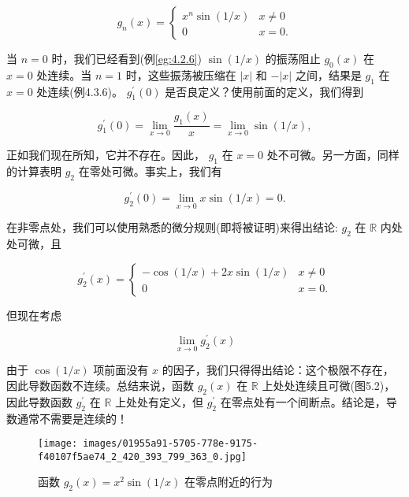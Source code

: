 \[
{g}_{n}\left( x\right)  = \left\{  \begin{array}{ll} {x}^{n}\sin \left( {1/x}\right) & x \neq  0 \\  0 & x = 0. \end{array}\right.
\]

当 \(n = 0\) 时，我们已经看到(例\ref{eg:4.2.6}) \(\sin \left( {1/x}\right)\) 的振荡阻止 \({g}_{0}\left( x\right)\) 在 \(x = 0\) 处连续。当 \(n = 1\) 时，这些振荡被压缩在 \(\left| x\right|\) 和 \(- \left| x\right|\) 之间，结果是 \({g}_{1}\) 在 \(x = 0\) 处连续(例4.3.6)。 \({g}_{1}^{\prime }\left( 0\right)\) 是否良定义？使用前面的定义，我们得到

\[
{g}_{1}^{\prime }\left( 0\right)  = \mathop{\lim }\limits_{{x \rightarrow  0}}\frac{{g}_{1}\left( x\right) }{x} = \mathop{\lim }\limits_{{x \rightarrow  0}}\sin \left( {1/x}\right) ,
\]

正如我们现在所知，它并不存在。因此， \({g}_{1}\) 在 \(x = 0\) 处不可微。另一方面，同样的计算表明 \({g}_{2}\) 在零处可微。事实上，我们有

\[
{g}_{2}^{\prime }\left( 0\right)  = \mathop{\lim }\limits_{{x \rightarrow  0}}x\sin \left( {1/x}\right)  = 0.
\]

在非零点处，我们可以使用熟悉的微分规则(即将被证明)来得出结论: \({g}_{2}\) 在 \(\mathbb{R}\) 内处处可微，且

\[
{g}_{2}^{\prime }\left( x\right)  = \left\{  \begin{array}{ll}  - \cos \left( {1/x}\right)  + {2x}\sin \left( {1/x}\right) & x \neq  0 \\  0 & x = 0. \end{array}\right.
\]

但现在考虑

\[
\mathop{\lim }\limits_{{x \rightarrow  0}}{g}_{2}^{\prime }\left( x\right)
\]

由于 \(\cos \left( {1/x}\right)\) 项前面没有 \(x\) 的因子，我们只得得出结论：这个极限不存在，因此导数函数不连续。总结来说，函数 \({g}_{2}\left( x\right)\) 在 \(\mathbb{R}\) 上处处连续且可微(图5.2)，因此导数函数 \({g}_{2}^{\prime }\) 在 \(\mathbb{R}\) 上处处有定义，但 \({g}_{2}^{\prime }\) 在零点处有一个间断点。结论是，导数通常不需要是连续的！

\begin{figure}[t]
  \centering
  \texttt{[image: images/01955a91-5705-778e-9175-f40107f5ae74\_2\_420\_393\_799\_363\_0.jpg]}
  \caption{函数 \({g}_{2}\left( x\right)  = {x}^{2}\sin \left( {1/x}\right)\) 在零点附近的行为}
  \label{fig:5.2}
\end{figure}


